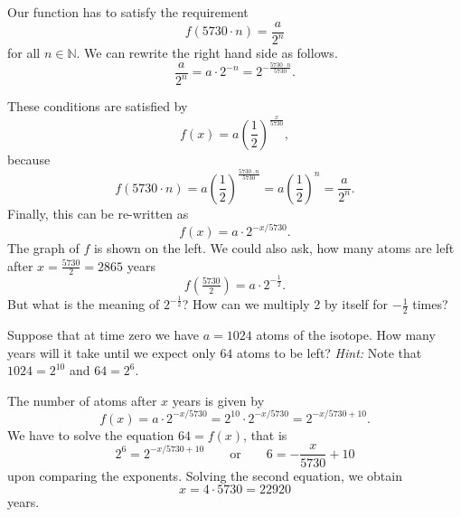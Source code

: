 Our function has to satisfy the requirement
\begin{equation*}
	f\left(5730\cdot n\right)=\frac{a}{2^n}
\end{equation*}
for all $n\in\mathbb N$.
We can rewrite the right hand side as follows.
\begin{equation*}
	\frac{a}{2^n}=a\cdot 2^{-n}=2^{-\frac{5730\cdot n}{5730}}.
\end{equation*}

These conditions are satisfied by
\begin{equation*}
	f\left(x\right)=a\left(\frac{1}{2}\right)^{\tfrac{x}{5730}},
\end{equation*}
because
\begin{equation*}
	f\left(5730\cdot n\right)=a\left(\frac{1}{2}\right)^{\tfrac{5730\cdot n}{5730}}
	=a\left(\frac{1}{2}\right)^n
	=\frac{a}{2^n}.
\end{equation*}
Finally, this can be re-written as
\begin{equation*}
	f\left(x\right)=a\cdot 2^{-x/5730}.
\end{equation*}
The graph of $f$ is shown on the left.
We could also ask, how many  atoms are left after $x=\frac{5730}{2}=2865$ years
\begin{equation*}
	f\left(\tfrac{5730}{2}\right)=a\cdot 2^{-\frac{1}{2}}.
\end{equation*}
But what is the meaning of $2^{-\frac{1}{2}}$?
How can we multiply 2 by itself for $-\frac{1}{2}$ times?
\begin{exercise} \label{ex:c14}
	Suppose that at time zero we have $a=1024$ atoms of the  isotope.
	How many years will it take until we expect only $64$ atoms to be left?
	\textit{Hint:} Note that $1024=2^{10}$ and $64=2^6$.
\end{exercise}
\begin{solution*}
	The number of  atoms after $x$ years is given by
	\begin{equation*}
		f\left(x\right)=a\cdot 2^{-x/5730}=2^{10}\cdot 2^{-x/5730}=2^{-x/5730+10}.
	\end{equation*}
	We have to solve the equation $64=f\left(x\right)$, that is
	\begin{equation*}
		2^6=2^{-x/5730+10}\qquad\text{or}\qquad 6=-\frac{x}{5730}+10
	\end{equation*}
	upon comparing the exponents.
	Solving the second equation, we obtain
	\begin{equation*}
		x=4\cdot 5730=22920
	\end{equation*}
	years.
\end{solution*}
